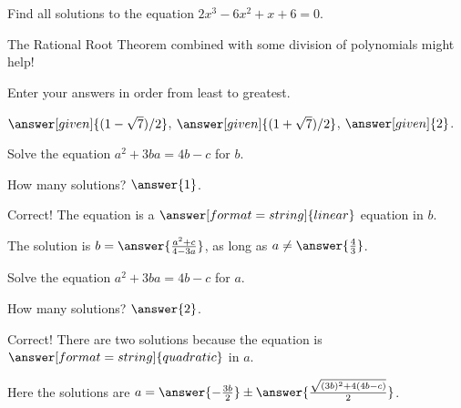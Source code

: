 \documentclass[nooutcomes]{ximera}
\begin{document}


\begin{problem}
Find all solutions to the equation $2x^3-6x^2+x+6=0$. 
\begin{hint} 
The Rational Root Theorem combined with some division of polynomials might help!
\end{hint}
Enter your answers in order from least to greatest.
\begin{prompt}
$\answer[given]{(1-\sqrt{7})/2}$, $\answer[given]{(1+\sqrt{7})/2}$, $\answer[given]{2}$.
\end{prompt}
\end{problem}

\begin{problem}

Solve the equation $a^2+3ba = 4b - c$ for $b$. 

How many solutions? $\answer{1}$.

\begin{problem}
Correct!  The equation is a $\answer[format=string]{linear}$ equation in $b$.  

The solution is $b=\answer{\frac{a^2 + c}{4 - 3 a}}$, as long as $a\ne\answer{\frac{4}{3}}$.  
\end{problem}
\end{problem}


\begin{problem}
Solve the equation $a^2+3ba = 4b - c$ for $a$. 

How many solutions? $\answer{2}$.
\begin{problem}
Correct!  There are two solutions because the equation is $\answer[format=string]{quadratic}$ in $a$.  

Here the solutions are $a=\answer{-\frac{3b}{2}}\pm \answer{\frac{\sqrt{(3b)^2 + 4(4b-c)}}{2}}$.  
\end{problem}
\end{problem}
\end{document}
